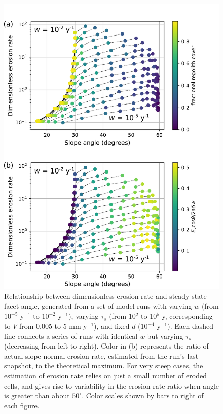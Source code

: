 \begin{figure}[ht!]
\centerline{\includegraphics[scale=0.75]{figure14.pdf}}
\caption{Relationship between dimensionless erosion rate and steady-state facet angle, generated from a set of model runs with varying $w$ (from $10^{-5}$ y$^{-1}$ to $10^{-2}$ y$^{-1}$), varying $\tau_s$ (from 10$^2$ to 10$^5$ y, corresponding to $V$ from 0.005 to 5 mm y$^{-1}$), and fixed $d$ ($10^{-4}$ y$^{-1}$). Each dashed line connects a series of runs with identical $w$ but varying $\tau_s$ (decreasing from left to right). Color in (b) represents the ratio of actual slope-normal erosion rate, estimated from the run's last snapshot, to the theoretical maximum. For very steep cases, the estimation of erosion rate relies on just a small number of eroded cells, and gives rise to variability in the erosion-rate ratio when angle is greater than about $50^\circ$. Color scales shown by bars to right of each figure.}
\label{fig:eroslope}
\end{figure}

